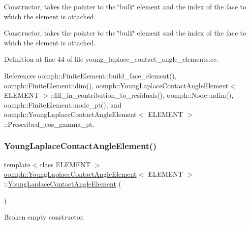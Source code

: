 Constructor, takes the pointer to the \char`\"{}bulk\char`\"{} element and the index of the face to which the element is attached. 

Constructor, takes the pointer to the \char`\"{}bulk\char`\"{} element and the index of the face to which the element is attached. 

Definition at line 44 of file young\+\_\+laplace\+\_\+contact\+\_\+angle\+\_\+elements.\+cc.



References oomph\+::\+Finite\+Element\+::build\+\_\+face\+\_\+element(), oomph\+::\+Finite\+Element\+::dim(), oomph\+::\+Young\+Laplace\+Contact\+Angle\+Element$<$ E\+L\+E\+M\+E\+N\+T $>$\+::fill\+\_\+in\+\_\+contribution\+\_\+to\+\_\+residuals(), oomph\+::\+Node\+::ndim(), oomph\+::\+Finite\+Element\+::node\+\_\+pt(), and oomph\+::\+Young\+Laplace\+Contact\+Angle\+Element$<$ E\+L\+E\+M\+E\+N\+T $>$\+::\+Prescribed\+\_\+cos\+\_\+gamma\+\_\+pt.

\mbox{\label{classoomph_1_1YoungLaplaceContactAngleElement_ac7fff7e187e14fed48b43c2b322b8b85}} 
\subsubsection{\texorpdfstring{Young\+Laplace\+Contact\+Angle\+Element()}{YoungLaplaceContactAngleElement()}\hspace{0.1cm}{\footnotesize\ttfamily [2/3]}}
{\footnotesize\ttfamily template$<$class E\+L\+E\+M\+E\+NT $>$ \\
\hyperlink{classoomph_1_1YoungLaplaceContactAngleElement}{oomph\+::\+Young\+Laplace\+Contact\+Angle\+Element}$<$ E\+L\+E\+M\+E\+NT $>$\+::\hyperlink{classoomph_1_1YoungLaplaceContactAngleElement}{Young\+Laplace\+Contact\+Angle\+Element} (\begin{DoxyParamCaption}{ }\end{DoxyParamCaption})\hspace{0.3cm}{\ttfamily [inline]}}



Broken empty constructor. 



